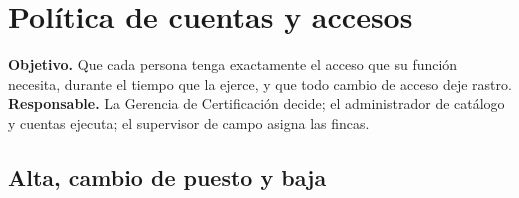 \documentclass[11pt,letterpaper]{article}
\begin{document}
\section{Política de cuentas y accesos}
\label{sec:cuentas}

\textbf{Objetivo.} Que cada persona tenga exactamente el acceso que su función necesita, durante el
tiempo que la ejerce, y que todo cambio de acceso deje rastro.
\textbf{Responsable.} La Gerencia de Certificación decide; el administrador de catálogo y cuentas ejecuta;
el supervisor de campo asigna las fincas.

\subsection{Alta, cambio de puesto y baja}
\end{document}
